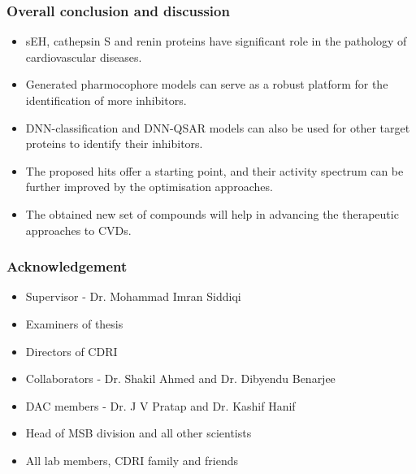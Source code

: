 \documentclass{beamer}
\begin{document}
\begin{frame}
\frametitle{\textbf{Overall conclusion and discussion}}
\begin{itemize}
\item sEH, cathepsin S and renin proteins have significant role in the pathology of cardiovascular diseases.
\item Generated pharmocophore models can serve as a robust platform for the identification of more inhibitors.
\item DNN-classification and DNN-QSAR models can also be used for other target proteins to identify their inhibitors.
\item The proposed hits offer a starting point, and their activity spectrum can be further improved by the optimisation approaches.
\item The obtained new set of compounds will help in advancing the therapeutic approaches to CVDs.
\end{itemize}
\end{frame}


\begin{frame}
\frametitle{\textbf{Acknowledgement}}
\begin{itemize}
\item Supervisor - Dr. Mohammad Imran Siddiqi
\item Examiners of thesis
\item Directors of CDRI
\item Collaborators - Dr. Shakil Ahmed and Dr. Dibyendu Benarjee
\item DAC members - Dr. J V Pratap and Dr. Kashif Hanif
\item Head of MSB division and all other scientists
\item All lab members, CDRI family and friends
\end{itemize}
\end{frame}

\end{document}
